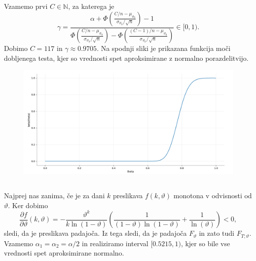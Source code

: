 \documentclass[ letterpaper, titlepage, fleqn]{article}
\newcommand{\N}{\mathbb N}
\begin{document}
Vzamemo prvi $C\in\N$, za katerega je 
$$\gamma = \frac{\alpha +
\Phi\left(\frac{C/n - \mu_{\vartheta_0}}{\sigma_{\vartheta_0} / \sqrt{n}}\right) - 1}
{\Phi\left(\frac{C/n - \mu_{\vartheta_0}}{\sigma_{\vartheta_0} / \sqrt{n}}\right) -
\Phi\left(\frac{(C-1)/n - \mu_{\vartheta_0}}{\sigma_{\vartheta_0} / \sqrt{n}}\right)} \in [0,1).$$
Dobimo $C = 117$ in $\gamma \approx 0.9705$. Na spodnji sliki je prikazana funkcija moči dobljenega testa,
kjer so vrednosti spet aproksimirane z normalno porazdelitvijo.
\begin{center}
\begin{figure}[h]
\begin{center}
\includegraphics[width=13cm]{graphics/FunkcijaMoci.png}
\end{center}
\end{figure}
\end{center}

\subsection{}
Najprej nas zanima, če je za dani $k$ preslikava $f(k, \vartheta)$ monotona v odvisnosti od $\vartheta$. Ker dobimo
$$\frac{\partial f}{\partial\vartheta} (k, \vartheta) = -\frac{\vartheta^k}{k\ln(1-\vartheta)} \left(\frac{1}{(1-\vartheta)\ln(1-\vartheta)} + \frac{1}{\ln(\vartheta)}\right) < 0,$$
sledi, da je preslikava padajoča. Iz tega sledi, da je padajoča $F_\vartheta$ in zato tudi $F_{T; \vartheta}$. Vzamemo $\alpha_1 = \alpha_2 = \alpha/2$ in realiziramo interval $[0.5215, 1)$, kjer so bile vse vrednosti spet aproksimirane normalno.

\section{}
\end{document}
